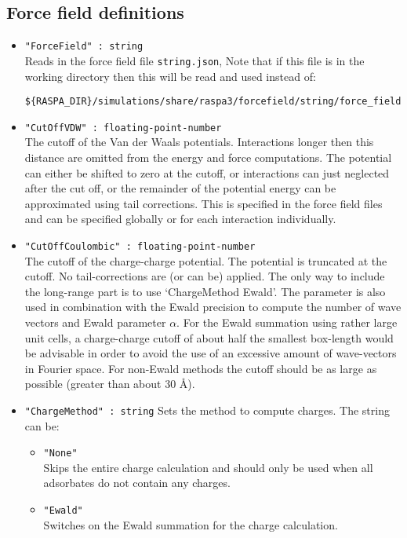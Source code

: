 \subsection{Force field definitions}

\begin{itemize}
\item{\verb+"ForceField" : string+}\\
Reads in the force field file \verb+string.json+,
Note that if this file is in the working directory then this will be read and used instead of:
\begin{verbatim}
${RASPA_DIR}/simulations/share/raspa3/forcefield/string/force_field.json
\end{verbatim}
\item{\verb+"CutOffVDW" : floating-point-number+}\\
The cutoff of the Van der Waals potentials. Interactions longer then this distance are omitted from the
energy and force computations. The potential can either be shifted to zero at the cutoff, or interactions
can just neglected after the cut off, or the remainder of the potential energy can be approximated using
tail corrections. This is specified in the force field files and can be specified globally or
for each interaction individually.
\item{\verb+"CutOffCoulombic" : floating-point-number+}\\
The cutoff of the charge-charge potential. The potential is truncated at the cutoff.
No tail-corrections are (or can be) applied. The only way to include the long-range part is to use `ChargeMethod Ewald'.
The parameter is also used in combination with the
Ewald precision to compute the number of wave vectors and Ewald parameter $\alpha$.
For the Ewald summation using rather large unit cells, a charge-charge cutoff of about half the smallest box-length would be advisable
in order to avoid the use of an excessive amount of wave-vectors in Fourier space. For non-Ewald methods the cutoff should be as large
as possible (greater than about 30 \AA).
\item{\verb+"ChargeMethod" : string+}
Sets the method to compute charges. The string can be:
  \begin{itemize}
  \item{\verb+"None"+}\\
    Skips the entire charge calculation and should only be used when all adsorbates do not contain any charges.
  \item{\verb+"Ewald"+}\\
    Switches on the Ewald summation for the charge calculation.
  \end{itemize}
\end{itemize}

